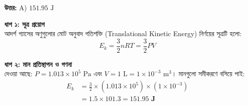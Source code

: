 \documentclass[12pt, a4paper]{article}
\begin{document}
\vspace{0.5em}
\begin{tcolorbox}[answerbox]
    \textbf{\color{success} উত্তর:} A) $151.95\text{ J}$
\end{tcolorbox}
\vspace{1em}

\begin{tcolorbox}[solutionbox={সমাধান (Solution)}]
    \noindent
    \textbf{ধাপ ১: সূত্র প্রয়োগ} \\
    আদর্শ গ্যাসের অণুগুলোর মোট অনুবাদ গতিশক্তি (Translational Kinetic Energy) নির্ণয়ের সূত্রটি হলো:
    \[ E_k = \frac{3}{2} n R T = \frac{3}{2} P V \]
    
    \vspace{0.4em}
    \noindent\textbf{ধাপ ২: মান প্রতিস্থাপন ও গণনা} \\
    দেওয়া আছে: $P = 1.013 \times 10^5\text{ Pa}$ এবং $V = 1\text{ L} = 1 \times 10^{-3}\text{ m}^3$। মানগুলো সমীকরণে বসিয়ে পাই:
    \begin{align*}
        E_k &= \frac{3}{2} \times (1.013 \times 10^5) \times (1 \times 10^{-3}) \\
        &= 1.5 \times 101.3 = \mathbf{151.95\text{ J}}
    \end{align*}
\end{tcolorbox}
\end{document}
